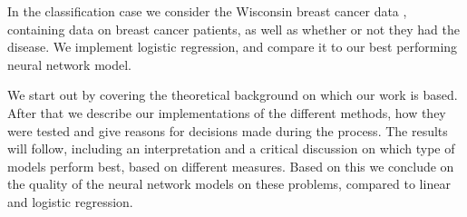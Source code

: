 In the classification case we consider the Wisconsin breast cancer data \cite{breast_cancer_wisconsin}, containing data on breast cancer patients, as well as whether or not they had the disease.
We implement logistic regression, and compare it to our best performing neural network model.

We start out by covering the theoretical background on which our work is based.
After that we describe our implementations of the different methods, how they were tested and give reasons for decisions made during the process.
The results will follow, including an interpretation and a critical discussion on which type of models perform best, based on different measures.
Based on this we conclude on the quality of the neural network models on these problems, compared to linear and logistic regression.